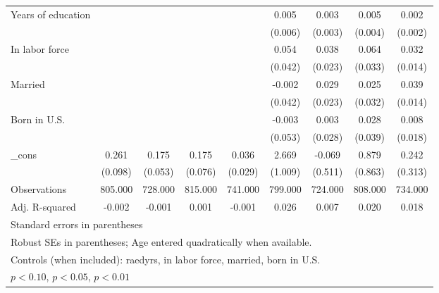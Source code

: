 \begin{table}[htbp]
\begin{tabular}{l*{8}{c}}
Years of education&                  &                  &                  &                  &    0.005         &    0.003         &    0.005         &    0.002         \\
          &                  &                  &                  &                  &  (0.006)         &  (0.003)         &  (0.004)         &  (0.002)         \\
In labor force&                  &                  &                  &                  &    0.054         &    0.038         &    0.064\sym{*}  &    0.032\sym{**} \\
          &                  &                  &                  &                  &  (0.042)         &  (0.023)         &  (0.033)         &  (0.014)         \\
Married   &                  &                  &                  &                  &   -0.002         &    0.029         &    0.025         &    0.039\sym{***}\\
          &                  &                  &                  &                  &  (0.042)         &  (0.023)         &  (0.032)         &  (0.014)         \\
Born in U.S.&                  &                  &                  &                  &   -0.003         &    0.003         &    0.028         &    0.008         \\
          &                  &                  &                  &                  &  (0.053)         &  (0.028)         &  (0.039)         &  (0.018)         \\
\_cons    &    0.261\sym{***}&    0.175\sym{***}&    0.175\sym{**} &    0.036         &    2.669\sym{***}&   -0.069         &    0.879         &    0.242         \\
          &  (0.098)         &  (0.053)         &  (0.076)         &  (0.029)         &  (1.009)         &  (0.511)         &  (0.863)         &  (0.313)         \\
\midrule
Observations&  805.000         &  728.000         &  815.000         &  741.000         &  799.000         &  724.000         &  808.000         &  734.000         \\
Adj. R-squared&   -0.002         &   -0.001         &    0.001         &   -0.001         &    0.026         &    0.007         &    0.020         &    0.018         \\
\bottomrule
\multicolumn{9}{l}{\footnotesize Standard errors in parentheses}\\
\multicolumn{9}{l}{\footnotesize Robust SEs in parentheses; Age entered quadratically when available.}\\
\multicolumn{9}{l}{\footnotesize Controls (when included): raedyrs, in labor force, married, born in U.S.}\\
\multicolumn{9}{l}{\footnotesize \sym{*} \(p<0.10\), \sym{**} \(p<0.05\), \sym{***} \(p<0.01\)}\\
\end{tabular}
\end{table}
